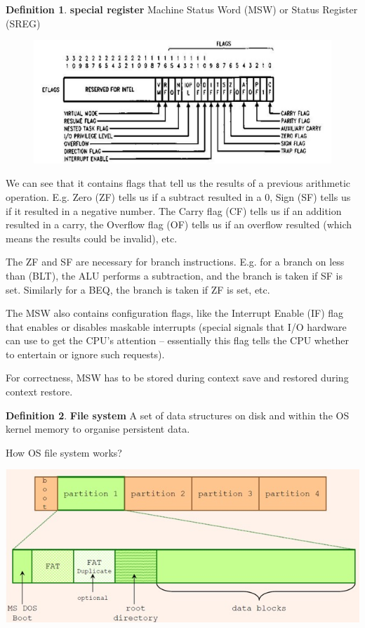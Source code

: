 \documentclass[11pt,a4paper]{article}
\theoremstyle{definition}
\newtheorem{definition}{Definition}[section]
\begin{document}
\begin{definition}{\textbf{special register} Machine Status Word (MSW) or Status Register (SREG)}
\begin{figure}[!h]
	\includegraphics[scale=0.2]{m1/machineStatusWord}
	\centering
\end{figure}

	We can see that it contains flags that tell us the results of a previous arithmetic operation. E.g. Zero (ZF) tells us if a subtract resulted in a 0, Sign (SF) tells us if it resulted in a negative number. The Carry flag (CF) tells us if an addition resulted in a carry, the Overflow flag (OF) tells us if an overflow resulted (which means the results could be invalid), etc.
	
	The ZF and SF are necessary for branch instructions. E.g. for a branch on less than (BLT), the ALU performs a subtraction, and the branch is taken if SF is set. Similarly for a BEQ, the branch is taken if ZF is set, etc.
	
	The MSW also contains configuration flags, like the Interrupt Enable (IF) flag that enables or disables maskable interrupts (special signals that I/O hardware can use to get the CPU's attention – essentially this flag tells the CPU whether to entertain or ignore such requests).
	
	For correctness, MSW has to be stored during context save and restored during context restore.
\end{definition}

\begin{definition}{\textbf{File system}}
	A set of data structures on disk and within the OS kernel memory to organise persistent data.
\end{definition}

\begin{tcolorbox}
\textsf{How OS file system works?}

	\includegraphics[scale=0.3]{m1/fileSystem}
	\centering
\end{tcolorbox}
\end{document}
